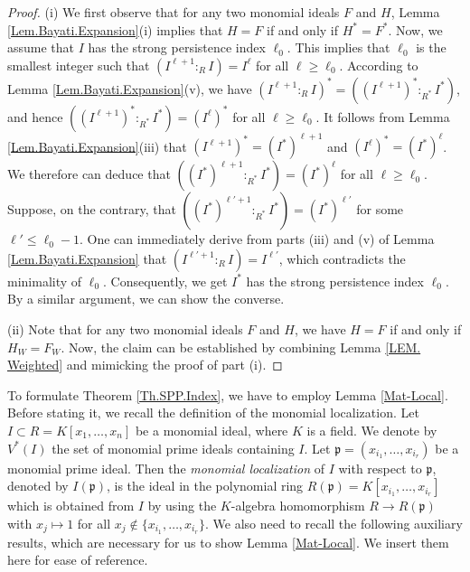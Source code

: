 \documentclass[11pt]{amsart}
\begin{document}
\begin{proof}
(i) We first observe that for any two monomial ideals $F$ and $H$, Lemma \ref{Lem.Bayati.Expansion}(i) implies that $H=F$ if and only if $H^*=F^*$. 
Now, we assume that $I$ has the strong persistence index $\ell_0$. This implies that $\ell_0$ is the smallest integer such that $(I^{\ell+1}:_RI)=I^{\ell}$ for all  $\ell\geq \ell_0$. According to Lemma \ref{Lem.Bayati.Expansion}(v), we have $(I^{\ell+1} :_R I)^* = ((I^{\ell+1})^*:_{R^*} I^*)$, and hence 
 $((I^{\ell+1})^*:_{R^*} I^*)=(I^{\ell})^{*}$  for all  $\ell\geq \ell_0$. It follows from Lemma \ref{Lem.Bayati.Expansion}(iii) that 
$(I^{\ell+1})^*=(I^*)^{\ell+1}$ and $(I^{\ell})^*=(I^*)^{\ell}$.  We therefore can deduce that   $((I^*)^{\ell+1}:_{R^*} I^*)=(I^*)^{\ell}$  for all  $\ell\geq \ell_0$. Suppose, on the contrary, that $((I^*)^{\ell'+1}:_{R^*} I^*)=(I^*)^{\ell'}$  for some   $\ell'\leq \ell_0-1$.
 One can immediately derive from parts (iii) and (v) of  Lemma \ref{Lem.Bayati.Expansion}   that $(I^{\ell'+1}:_RI)=I^{\ell'}$, which contradicts the minimality of $\ell_0$. 
Consequently, we get $I^*$ has the  strong persistence index $\ell_0$. 
 By a similar argument,  we can show  the converse.

(ii)   Note that for any two monomial ideals $F$ and  $H$, we have $H=F$ if and only if $H_W=F_W$. Now, the claim can be established by combining Lemma \ref{LEM. Weighted} and mimicking the proof of part (i).
\end{proof}



To formulate Theorem \ref{Th.SPP.Index}, we have to employ Lemma \ref{Mat-Local}.  Before stating it, we recall the definition of the  monomial localization. Let  $I\subset R=K[x_1, \ldots, x_n]$ be  a monomial ideal, where $K$ is a field. We  denote by $V^*(I)$ the set of monomial prime ideals containing $I$. Let $\mathfrak{p}=(x_{i_1}, \ldots, x_{i_r})$ be a monomial prime ideal. Then the  {\it monomial localization} of $I$ with respect to $\mathfrak{p}$, denoted by $I(\mathfrak{p})$, is the ideal in the polynomial ring $R(\mathfrak{p})=K[x_{i_1}, \ldots, x_{i_r}]$  which is obtained from $I$ by using the $K$-algebra homomorphism $R\rightarrow R(\mathfrak{p})$  with $x_j\mapsto 1$  for all $x_j\notin \{x_{i_1}, \ldots, x_{i_r}\}$. 
 We also  need to recall the following auxiliary  results, which are  necessary for us to show  Lemma \ref{Mat-Local}. We insert them here for ease of reference.
\end{document}
